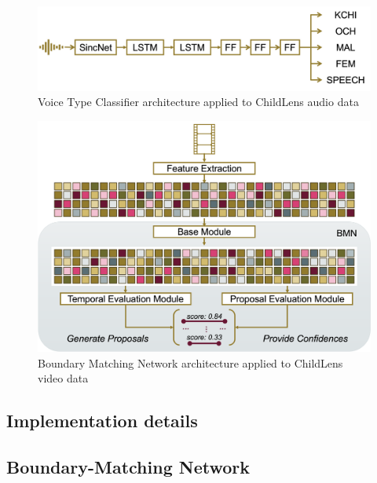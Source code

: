 \documentclass[
  man,floatsintext]{apa6}
\begin{document}
\begin{figure}

{\centering \includegraphics[width=4.91in]{VTC_architecture} 

}

\caption{Voice Type Classifier architecture applied to ChildLens audio data}\label{fig:vtc-architecture}
\end{figure}

\begin{figure}

{\centering \includegraphics[width=4.98in]{BMN_architecture} 

}

\caption{Boundary Matching Network architecture applied to ChildLens video data}\label{fig:bmn-architecture}
\end{figure}

\subsection{Implementation details}\label{implementation-details}

\subsection{Boundary-Matching Network}\label{boundary-matching-network}
\end{document}
